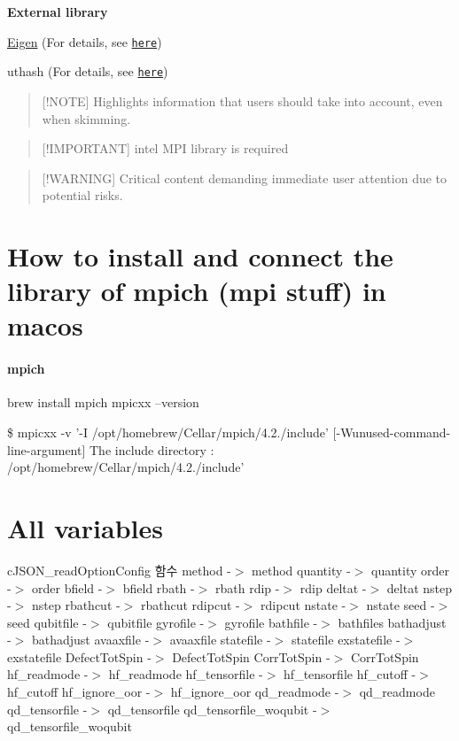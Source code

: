 {\bfseries External library}\par
 \hyperlink{namespaceEigen}{Eigen} (For details, see \href{https://eigen.tuxfamily.org/index.php?title=Main_Page}{\tt here})\par
 uthash (For details, see \href{https://troydhanson.github.io/uthash/userguide.html#_a_hash_in_c}{\tt here})\par
 \par


\begin{quotation}
\mbox{[}!\-N\-O\-T\-E\mbox{]} Highlights information that users should take into account, even when skimming.

\end{quotation}


\begin{quotation}
\mbox{[}!\-I\-M\-P\-O\-R\-T\-A\-N\-T\mbox{]} intel M\-P\-I library is required

\end{quotation}


\begin{quotation}
\mbox{[}!\-W\-A\-R\-N\-I\-N\-G\mbox{]} Critical content demanding immediate user attention due to potential risks.

\end{quotation}


\section*{How to install and connect the library of mpich (mpi stuff) in macos}

\paragraph*{mpich}

brew install mpich mpicxx --version

\$ mpicxx -\/v '-\/\-I /opt/homebrew/\-Cellar/mpich/4.2./include' \mbox{[}-\/\-Wunused-\/command-\/line-\/argument\mbox{]} The include directory \-: /opt/homebrew/\-Cellar/mpich/4.2./include'

\section*{All variables}

c\-J\-S\-O\-N\-\_\-read\-Option\-Config 함수 method -\/$>$ method quantity -\/$>$ quantity order -\/$>$ order bfield -\/$>$ bfield rbath -\/$>$ rbath rdip -\/$>$ rdip deltat -\/$>$ deltat nstep -\/$>$ nstep rbathcut -\/$>$ rbathcut rdipcut -\/$>$ rdipcut nstate -\/$>$ nstate seed -\/$>$ seed qubitfile -\/$>$ qubitfile gyrofile -\/$>$ gyrofile bathfile -\/$>$ bathfiles bathadjust -\/$>$ bathadjust avaaxfile -\/$>$ avaaxfile statefile -\/$>$ statefile exstatefile -\/$>$ exstatefile Defect\-Tot\-Spin -\/$>$ Defect\-Tot\-Spin Corr\-Tot\-Spin -\/$>$ Corr\-Tot\-Spin hf\-\_\-readmode -\/$>$ hf\-\_\-readmode hf\-\_\-tensorfile -\/$>$ hf\-\_\-tensorfile hf\-\_\-cutoff -\/$>$ hf\-\_\-cutoff hf\-\_\-ignore\-\_\-oor -\/$>$ hf\-\_\-ignore\-\_\-oor qd\-\_\-readmode -\/$>$ qd\-\_\-readmode qd\-\_\-tensorfile -\/$>$ qd\-\_\-tensorfile qd\-\_\-tensorfile\-\_\-woqubit -\/$>$ qd\-\_\-tensorfile\-\_\-woqubit

